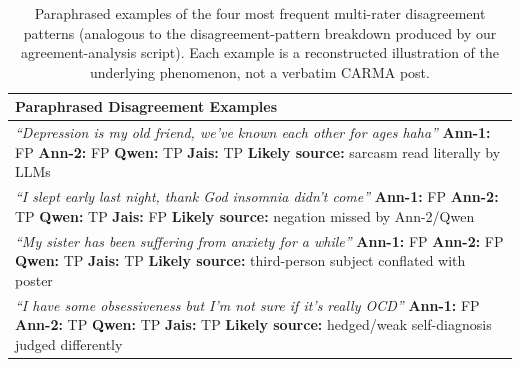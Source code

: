 \documentclass[11pt]{article}
\begin{document}
\begin{table}[t]
\centering
\footnotesize
\renewcommand{\arraystretch}{1.15}
\begin{tabular}{@{}p{}@{}}
\toprule
\textbf{Paraphrased Disagreement Examples} \\
\midrule
\textit{``Depression is my old friend, we've known each other for ages
haha''} \newline
\textbf{Ann-1:} FP \quad \textbf{Ann-2:} FP \quad \textbf{Qwen:} TP
\quad \textbf{Jais:} TP \quad \textbf{Likely source:} sarcasm read
literally by LLMs \\
\addlinespace[4pt] \hline \addlinespace[4pt]
\textit{``I slept early last night, thank God insomnia didn't
come''} \newline
\textbf{Ann-1:} FP \quad \textbf{Ann-2:} TP \quad \textbf{Qwen:} TP
\quad \textbf{Jais:} FP \quad \textbf{Likely source:} negation missed
by Ann-2/Qwen \\
\addlinespace[4pt] \hline \addlinespace[4pt]
\textit{``My sister has been suffering from anxiety for a
while''} \newline
\textbf{Ann-1:} FP \quad \textbf{Ann-2:} FP \quad \textbf{Qwen:} TP
\quad \textbf{Jais:} TP \quad \textbf{Likely source:} third-person
subject conflated with poster \\
\addlinespace[4pt] \hline \addlinespace[4pt]
\textit{``I have some obsessiveness but I'm not sure if it's really
OCD''} \newline
\textbf{Ann-1:} FP \quad \textbf{Ann-2:} TP \quad \textbf{Qwen:} TP
\quad \textbf{Jais:} TP \quad \textbf{Likely source:} hedged/weak
self-diagnosis judged differently \\
\bottomrule
\end{tabular}
\caption{Paraphrased examples of the four most frequent multi-rater
disagreement patterns (analogous to the disagreement-pattern breakdown
produced by our agreement-analysis script). Each example is a
reconstructed illustration of the underlying phenomenon, not a verbatim
CARMA post.}
\label{tab:disagreement_examples}
\end{table}
\end{document}
